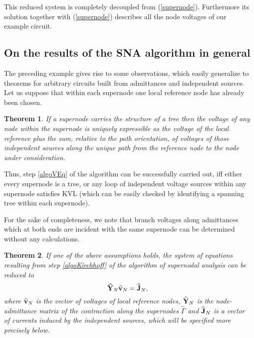 \documentclass[10pt,journal,twocolumn,pagenumbers]{IEEEtran}
\newtheorem{theorem}{Theorem}
\begin{document}
This reduced system is completely decoupled from (\ref{supernode}). Furthermore its solution together with (\ref{supernode}) describes all the node voltages of our example circuit.



\subsection{On the results of the SNA algorithm in general}

The preceding example gives rise to some observations, which easily generalize to theorems for arbitrary circuits built from admittances and independent sources. Let us suppose that within each supernode one local reference node has already been chosen.

\smallskip
\begin{theorem}
If a supernode carries the structure of a tree then the voltage of any node within the supernode is uniquely expressible as the voltage of the local reference plus the sum, relative to the path orientation, of voltages of those independent sources along the unique path from the reference node to the node under consideration.
\end{theorem}

\smallskip
Thus, step \ref{algoVEq} of the algorithm can be successfully carried out, iff either every supernode is a tree, or any loop of independent voltage sources within any supernode satisfies KVL (which can be easily checked by identifying a spanning tree within each supernode). 

For the sake of completeness, we note that branch voltages along admittances which at both ends are incident with the same supernode can be determined without any calculations.

\smallskip
\begin{theorem}
If one of the above assumptions holds, the system of equations resulting from step \ref{algoKirchhoff} of the algorithm of supernodal analysis can be reduced to
\begin{equation}
\widehat{\bf Y}_N \widehat{\bf v}_N = \widehat{\bf J}_N,
\end{equation}
where $\widehat{\bf v}_N$ is the vector of voltages of local reference nodes, $\widehat{\bf Y}_N$ is the node-admittance matrix of the contraction along the supernodes $\widehat{\Gamma}$ and $\widehat{\bf J}_N$ is a vector of currents induced by the independent sources, which will be specified more precisely below.
\end{theorem}
\end{document}
